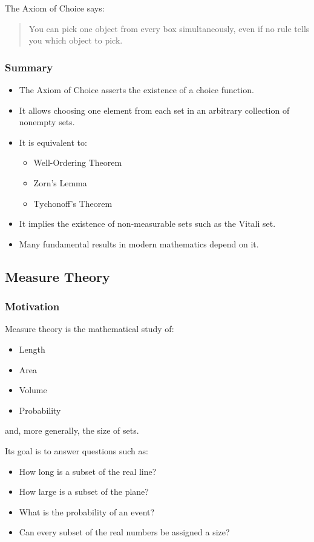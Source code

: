 \documentclass[11pt]{article}
\begin{document}
The Axiom of Choice says:

\begin{quote}
You can pick one object from every box simultaneously,
even if no rule tells you which object to pick.
\end{quote}
\subsubsection{Summary}
\label{sec:org82e85bd}

\begin{itemize}
\item The Axiom of Choice asserts the existence of a choice function.
\item It allows choosing one element from each set in an arbitrary collection of
nonempty sets.
\item It is equivalent to:
\begin{itemize}
\item Well-Ordering Theorem
\item Zorn's Lemma
\item Tychonoff's Theorem
\end{itemize}
\item It implies the existence of non-measurable sets such as the Vitali set.
\item Many fundamental results in modern mathematics depend on it.
\end{itemize}
\subsection{Measure Theory}
\label{sec:orgbfa3f46}
\subsubsection{Motivation}
\label{sec:org1e1d359}

Measure theory is the mathematical study of:

\begin{itemize}
\item Length
\item Area
\item Volume
\item Probability
\end{itemize}

and, more generally, the size of sets.

Its goal is to answer questions such as:

\begin{itemize}
\item How long is a subset of the real line?
\item How large is a subset of the plane?
\item What is the probability of an event?
\item Can every subset of the real numbers be assigned a size?
\end{itemize}
\end{document}
